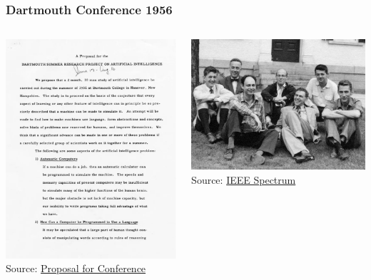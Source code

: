 \documentclass{beamer}
\begin{document}
\begin{frame}
  \frametitle{Dartmouth Conference 1956}
  \begin{columns}
    \includegraphics[width=\textwidth]{"Dartmouth-Summer-Conference-1956-proposal.jpeg"}    
    Source: \href{http://www-formal.stanford.edu/jmc/history/dartmouth.pdf}{Proposal for Conference}

    \includegraphics[width=\textwidth]{"Dartmouth-Summer-Conference-1956.jpeg"}    
    Source: \href{https://spectrum.ieee.org/dartmouth-ai-workshop}{IEEE Spectrum}

  \end{columns}

\end{frame}
\end{document}
